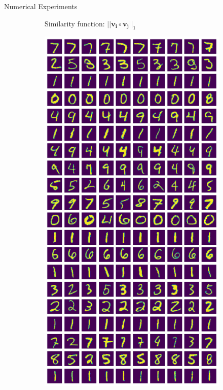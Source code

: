 \documentclass[10pt,a4paper, nocenter]{beamer}
\begin{document}
\begin{frame}{Numerical Experiments}
\begin{figure}[h]
\begin{center}
\begin{subfigure}[b]{0.4\textwidth}
					\caption{Similarity function: $\lvert \lvert \mathbf{v_i} \circ \mathbf{v_j} \rvert \rvert_1$}
					\label{fig:clustering_20_0norm}
				\end{subfigure}
				\begin{subfigure}[b]{0.4\textwidth}
					\centering
					\includegraphics[height={0.6\textheight}]{../../images/number_clustering_20_2norm.png}

\end{subfigure}
\end{center}
\end{figure}
\end{frame}
\end{document}
